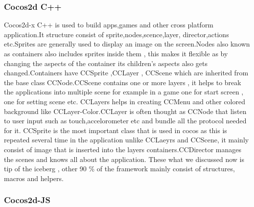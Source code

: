 \documentclass[23pt]{article}
\begin{document}
\subsubsection{Cocos2d C++ }

{\Large Cocos2d-x C++ is used to build apps,games and other cross platform application.It structure consist of sprite,nodes,scence,layer, director,actions etc.Sprites are generally used to display an image on the screen.Nodes also known as containers also includes sprites inside them , this makes it flexible as by changing the aspects of the container its children’s aspects also gets changed.Containers have CCSprite ,CCLayer , CCScene which are inherited from the base class CCNode.CCScene contains one or more layers , it helps to break the applications into multiple scene for example in a game one for start screen , one for setting scene etc. CCLayers helps in creating CCMenu and other colored background like CCLayer-Color.CCLayer is often thought as CCNode that listen to user input such as touch,accelorometer etc and bundle all the protocol needed for it. CCSprite is the most important class that is used in cocos as this is repeated several time in the application unlike CCLaeyrs and CCScene, it mainly consist of image that is inserted into the layers containers.CCDirector manages the scenes and knows all about the application. These what we discussed now is tip of the iceberg , other 90 \% of the framework mainly consist of structures, macros and helpers. \\ \par}


\subsubsection{Cocos2d-JS }
\end{document}
